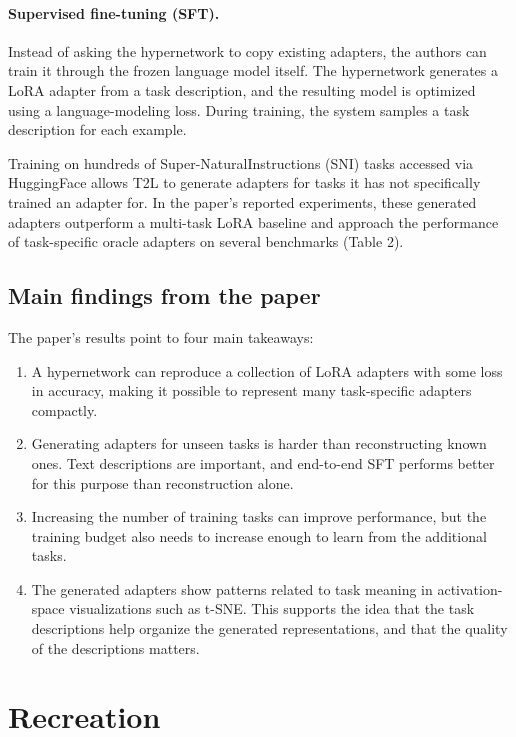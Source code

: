 \documentclass{article}
\begin{document}
\paragraph{Supervised fine-tuning (SFT).}
Instead of asking the hypernetwork to copy existing adapters, the authors can train it through the frozen language model itself. The hypernetwork generates a LoRA adapter from a task description, and the resulting model is optimized using a language-modeling loss. During training, the system samples a task description for each example.

Training on hundreds of Super-NaturalInstructions (SNI) tasks \cite{wang2022sni} accessed via HuggingFace allows T2L to generate adapters for tasks it has not specifically trained an adapter for. In the paper's reported experiments, these generated adapters outperform a multi-task LoRA baseline and approach the performance of task-specific oracle adapters on several benchmarks (Table 2).

\subsection{Main findings from the paper}

The paper's results point to four main takeaways:

\begin{enumerate}
  \item A hypernetwork can reproduce a collection of LoRA adapters with some loss in accuracy, making it possible to represent many task-specific adapters compactly.
  \item Generating adapters for unseen tasks is harder than reconstructing known ones. Text descriptions are important, and end-to-end SFT performs better for this purpose than reconstruction alone.
  \item Increasing the number of training tasks can improve performance, but the training budget also needs to increase enough to learn from the additional tasks.
  \item The generated adapters show patterns related to task meaning in activation-space visualizations such as t-SNE. This supports the idea that the task descriptions help organize the generated representations, and that the quality of the descriptions matters.
\end{enumerate}

\section{Recreation}
\end{document}
